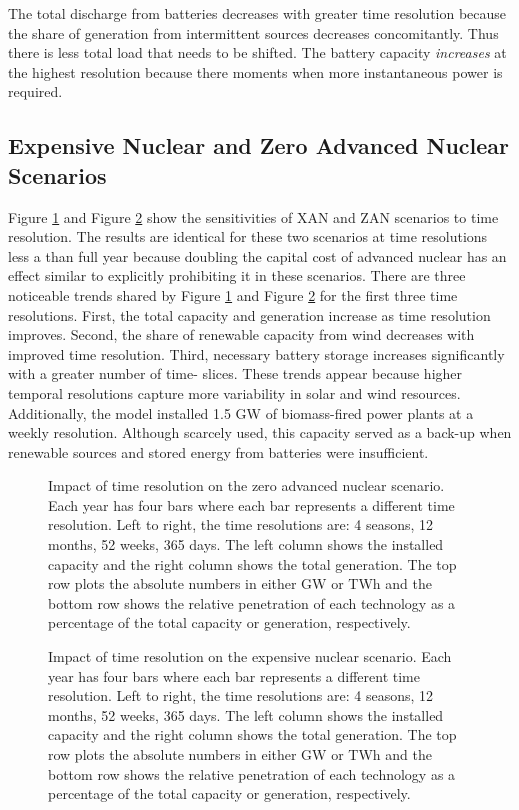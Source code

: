 The total discharge from batteries decreases with greater time resolution because
the share of generation from intermittent sources decreases concomitantly. Thus
there is less total load that needs to be shifted. The battery capacity \textit{increases}
at the highest resolution because there moments when more instantaneous power is
required.

\subsection{Expensive Nuclear and Zero Advanced Nuclear Scenarios}

Figure \ref{fig:time_res_ZAN} and Figure \ref{fig:time_res_XAN} show the sensitivities of
\gls{XAN} and \gls{ZAN} scenarios to time resolution.
The results are identical for these two scenarios at time resolutions less a than
full year because doubling the capital cost of advanced nuclear has an effect similar
to explicitly prohibiting it in these scenarios.
There are three noticeable trends shared by Figure \ref{fig:time_res_ZAN} and Figure
\ref{fig:time_res_XAN} for the first three time resolutions.
 First, the total capacity and generation increase as time resolution improves.
Second, the share of renewable capacity from wind decreases with improved time resolution.
Third, necessary battery storage increases significantly with a greater number of time-
slices. These trends appear because higher temporal resolutions capture more
variability in solar and wind resources. Additionally, the model installed 1.5 GW
of biomass-fired power plants at a weekly resolution. Although scarcely used,
this capacity served as a back-up when renewable sources and stored energy from
batteries were insufficient.

\begin{figure}[H]
  \centering
  \resizebox{0.95\columnwidth}{!}{}
  \caption{Impact of time resolution on the zero advanced nuclear scenario.
  Each year has four bars where each bar represents a different time resolution.
  Left to right, the time resolutions are: 4 seasons, 12 months, 52 weeks, 365 days.
  The left column shows the installed capacity and the right column shows the
  total generation. The top row plots the absolute numbers in either GW or TWh
  and the bottom row shows the relative penetration of each technology as a
  percentage of the total capacity or generation, respectively.}
  \label{fig:time_res_ZAN}
\end{figure}
\begin{figure}[H]
  \centering
  \resizebox{0.95\columnwidth}{!}{}
  \caption{Impact of time resolution on the expensive nuclear scenario.
  Each year has four bars where each bar represents a different time resolution.
  Left to right, the time resolutions are: 4 seasons, 12 months, 52 weeks, 365 days.
  The left column shows the installed capacity and the right column shows the
  total generation. The top row plots the absolute numbers in either GW or TWh
  and the bottom row shows the relative penetration of each technology as a
  percentage of the total capacity or generation, respectively.}
  \label{fig:time_res_XAN}
\end{figure}

